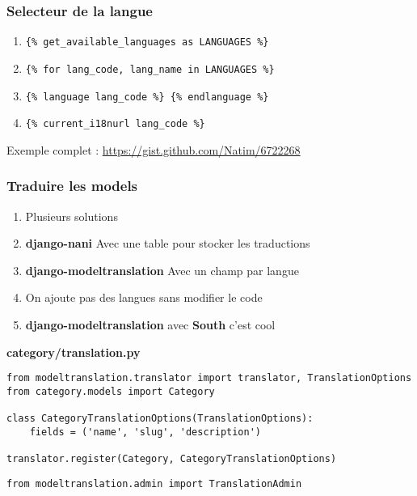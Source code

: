 \documentclass{beamer}
\begin{document}
\begin{frame}[fragile]
  \frametitle{Selecteur de la langue}
  \begin{enumerate}
    \item \texttt{\{\% get\_available\_languages as LANGUAGES \%\}}
    \pause \item \texttt{\{\% for lang\_code, lang\_name in LANGUAGES \%\}}
    \pause \item \texttt{\{\% language lang\_code \%\} \{\% endlanguage \%\}}
    \pause \item \texttt{\{\% current\_i18nurl lang\_code \%\}}
  \end{enumerate}
\pause
\vfill
  Exemple complet : \url{https://gist.github.com/Natim/6722268}
\vfill
\end{frame}

\begin{frame}[fragile]
  \frametitle{Traduire les models}
  \begin{enumerate}
    \item Plusieurs solutions
    \pause \item \textbf{django-nani} Avec une table pour stocker les traductions
    \pause \item \textbf{django-modeltranslation} Avec un champ par langue
    \pause \item On ajoute pas des langues sans modifier le code
    \pause \item \textbf{django-modeltranslation} avec \textbf{South} c'est cool
  \end{enumerate}
\pause
\textbf{category/translation.py}
\begin{lstlisting}
from modeltranslation.translator import translator, TranslationOptions
from category.models import Category

class CategoryTranslationOptions(TranslationOptions):
    fields = ('name', 'slug', 'description')

translator.register(Category, CategoryTranslationOptions)
\end{lstlisting}
\pause
\texttt{from modeltranslation.admin import TranslationAdmin}
\end{frame}
\end{document}
